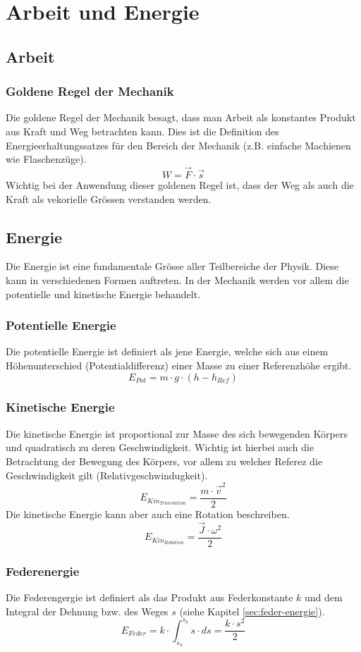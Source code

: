 \chapter{Arbeit und Energie}

\section{Arbeit}
\subsection{Goldene Regel der Mechanik}
Die goldene Regel der Mechanik besagt, dass man Arbeit als konstantes 
Produkt aus Kraft und Weg betrachten kann. Dies ist die Definition des
Energieerhaltungssatzes für den Bereich der Mechanik (z.B. einfache
Machienen wie Flaschenzüge).
\[ \boxed{W = \vec{F} \cdot \vec{s}} \] 
Wichtig bei der Anwendung dieser goldenen Regel ist, dass der Weg als
auch die Kraft als vekorielle Grössen verstanden werden. 

\section{Energie}
Die Energie ist eine fundamentale Grösse aller Teilbereiche der Physik.
Diese kann in verschiedenen Formen auftreten. In der Mechanik werden vor
allem die potentielle und kinetische Energie behandelt.

\subsection{Potentielle Energie}
Die potentielle Energie ist definiert als jene Energie, welche sich aus
einem Höhenunterschied (Potentialdifferenz) einer Masse zu einer 
Referenzhöhe ergibt. 
\[ \boxed{ E_{Pot} = m \cdot g \cdot (h - h_{Ref}) } \]

\subsection{Kinetische Energie}
Die kinetische Energie ist proportional zur Masse des sich bewegenden Körpers
und quadratisch zu deren Geschwindigkeit. Wichtig ist hierbei auch die 
Betrachtung der Bewegung des Körpers, vor allem zu welcher Referez die 
Geschwindigkeit gilt (Relativgeschwindugkeit).
\[ \boxed{ E_{Kin_{Translation}} = \frac{m \cdot \vec{v}^2}{2} } \]
Die kinetische Energie kann aber auch eine Rotation beschreiben.
\[ \boxed{ E_{Kin_{Rotation}} = \frac{\vec{J} \cdot \omega^2}{2} } \]

\subsection{Federenergie}
Die Federengergie ist definiert als das Produkt aus Federkonstante $k$ und 
dem Integral der Dehnung bzw. des Weges $s$ 
(siehe Kapitel \ref{sec:feder-energie}).
\[ \boxed{E_{Feder} = k \cdot \int_{s_a}^{s_b} s \cdot ds = \frac{k \cdot s^2}{2}} \]
